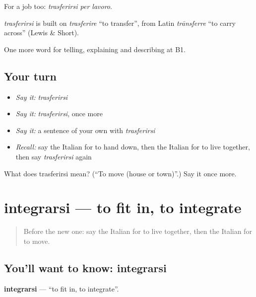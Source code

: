 For a job too: \emph{trasferirsi per lavoro}.

\begin{cousinweb}
\emph{trasferirsi} is built on \emph{trasferire} \textquotedblleft{}to transfer\textquotedblright{}, from Latin \emph{trānsferre} \textquotedblleft{}to carry across\textquotedblright{} (Lewis \& Short).
\end{cousinweb}

\begin{grammarlens}[title={What you've built}]
One more word for telling, explaining and describing at B1.
\end{grammarlens}

\subsection*{Your turn}
\begin{itemize}
\raggedright
  \item \emph{Say it:} \emph{trasferirsi}
  \item \emph{Say it:} \emph{trasferirsi}, once more
  \item \emph{Say it:} a sentence of your own with \emph{trasferirsi}
  \item \emph{Recall:} say the Italian for to hand down, then the Italian for to live together, then say \emph{trasferirsi} again
\end{itemize}

\begin{tcolorbox}[breakable,colback=teal!4,colframe=teal!35!black,title={Before you move on}]
What does trasferirsi mean? (\textquotedblleft{}To move (house or town)\textquotedblright{}.) Say it once more.
\end{tcolorbox}
\section[integrarsi]{integrarsi — to fit in, to integrate}

\label{lesson:IT-C310-integrarsi}



\begin{quote}
Before the new one: say the Italian for to live together, then the Italian for to move.
\end{quote}

\subsection*{You'll want to know: integrarsi}
\textbf{integrarsi} — \textquotedblleft{}to fit in, to integrate\textquotedblright{}.

